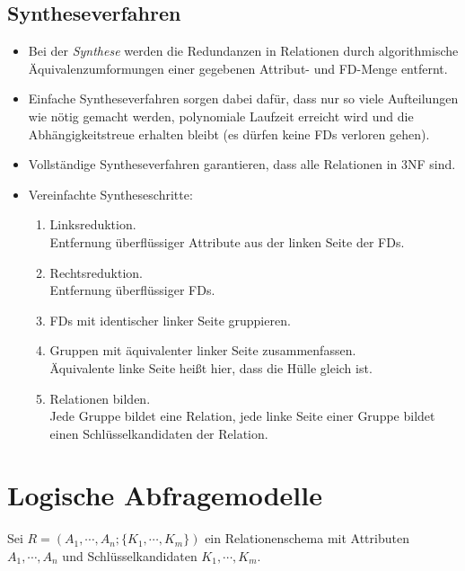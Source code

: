 \documentclass[a4paper, 11pt, accentcolor = tud3b]{tudreport}
\begin{document}
        \section{Syntheseverfahren} %
            \begin{itemize}
            	\item Bei der \textit{Synthese} werden die Redundanzen in Relationen durch algorithmische Äquivalenzumformungen einer gegebenen Attribut- und FD-Menge entfernt.
            	\item Einfache Syntheseverfahren sorgen dabei dafür, dass nur so viele Aufteilungen wie nötig gemacht werden, polynomiale Laufzeit erreicht wird und die Abhängigkeitstreue erhalten bleibt (es dürfen keine FDs verloren gehen).
            	\item Vollständige Syntheseverfahren garantieren, dass alle Relationen in 3NF sind.
            	\item Vereinfachte Syntheseschritte:
            		\begin{enumerate}
            			\item Linksreduktion. \\ Entfernung überflüssiger Attribute aus der linken Seite der FDs.
            			\item Rechtsreduktion. \\ Entfernung überflüssiger FDs.
            			\item FDs mit identischer linker Seite gruppieren.
            			\item Gruppen mit äquivalenter linker Seite zusammenfassen. \\ Äquivalente linke Seite heißt hier, dass die Hülle gleich ist.
            			\item Relationen bilden. \\ Jede Gruppe bildet eine Relation, jede linke Seite einer Gruppe bildet einen Schlüsselkandidaten der Relation.
            		\end{enumerate}
            \end{itemize}

    \chapter{Logische Abfragemodelle} %
	    \label{c:logic_query}
	    
	    Sei \( R = (A_1, \cdots, A_n; \{ K_1, \cdots, K_m \}) \) ein Relationenschema mit Attributen \( A_1, \cdots, A_n \) und Schlüsselkandidaten \( K_1, \cdots, K_m \).
	    
\end{document}
